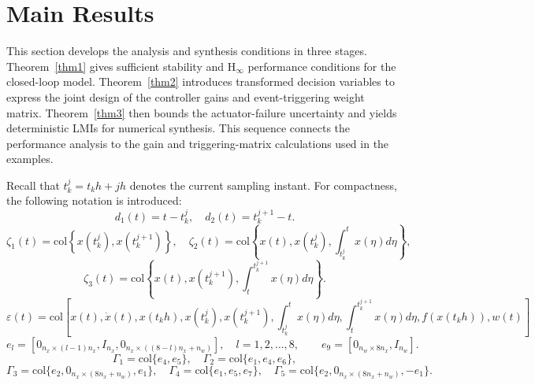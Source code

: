 \documentclass[preprint,review,fleqn,sort&compress,3p]{elsarticle}
\theoremstyle{definition} %
\theoremstyle{definition}%
\begin{document}
\section{Main Results}\label{sec3}
This section develops the analysis and synthesis conditions in three stages. Theorem~\ref{thm1} gives sufficient stability and $\mathrm{H}_\infty$ performance conditions for the closed-loop model. Theorem~\ref{thm2} introduces transformed decision variables to express the joint design of the controller gains and event-triggering weight matrix. Theorem~\ref{thm3} then bounds the actuator-failure uncertainty and yields deterministic LMIs for numerical synthesis. This sequence connects the performance analysis to the gain and triggering-matrix calculations used in the examples.

Recall that $t_k^j=t_k h+jh$ denotes the current sampling instant. For compactness, the following notation is introduced:
\begin{equation*}
	d_1(t) = t - t^j_k, \quad  
	d_2(t) = t^{j+1}_{k} - t.
\end{equation*}
\begin{equation*}
	\zeta_1(t) = \mathrm{col} \left\{ x(t^j_k),  x(t^{j+1}_{k}) \right\}, \quad
	\zeta_2(t) = \mathrm{col} \left\{ x(t), x(t_k^j), \int_{t_k^j}^t x(\eta) d\eta \right\},
\end{equation*}
\begin{equation*}
	\zeta_3(t) = \mathrm{col} \left\{ x(t), x(t_k^{j+1}), \int_t^{t_k^{j+1}} x(\eta) d\eta \right\}.
\end{equation*}
\begin{equation*}
	\varepsilon(t) = \mathrm{col}\left[
	x(t),   \dot{x}(t),   x(t_k h),
	x(t_k^j),   x(t^{j+1}_k),
	\int_{t_k^j}^{t} x(\eta) d\eta,
	\int_{t}^{t_k^{j+1}} x(\eta) d\eta,
	f(x(t_k h)),  w(t)
	\right]
\end{equation*}
\begin{equation*}
	e_l = \left[ 0_{n_x \times (l-1)n_x}, I_{n_x}, 0_{n_x \times ((8-l)n_x+n_w)} \right],\quad l = 1,2,\dots,8,\qquad e_9 = \left[ 0_{n_w \times 8n_x}, I_{n_w} \right].
\end{equation*}
\begin{equation*}
	\Gamma_{1}=\mathrm{col}\{e_{4},e_{5}\},\quad
	\Gamma_{2}=\mathrm{col}\{e_{1},e_{4},e_{6}\},
\end{equation*}
\begin{equation*}
	\Gamma_{3}=\mathrm{col}\{e_{2},0_{n_x\times (8n_x+n_w)},e_{1}\},\quad
	\Gamma_{4}=\mathrm{col}\{e_{1},e_{5},e_{7}\},\quad
	\Gamma_{5}=\mathrm{col}\{e_{2},0_{n_x\times (8n_x+n_w)},-e_{1}\}.
\end{equation*}
\end{document}
